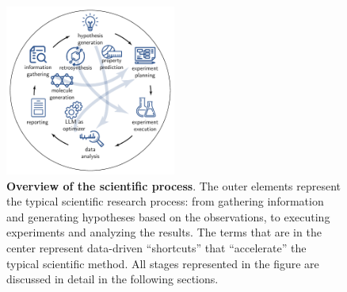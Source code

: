 \begin{figure}[!ht]
    \centering
    \label{fig:applications}
    \includegraphics[width=0.5\textwidth]{figures/rescaled_figures/chemrev_figure11.pdf}
    \caption{\textbf{Overview of the scientific process}. The outer elements represent the typical scientific research process: from gathering information and generating hypotheses based on the observations, to executing experiments and analyzing the results. The terms that are in the center represent data-driven \enquote{shortcuts} that \enquote{accelerate} the typical scientific method. All stages represented in the figure are discussed in detail in the following sections.}
\end{figure}